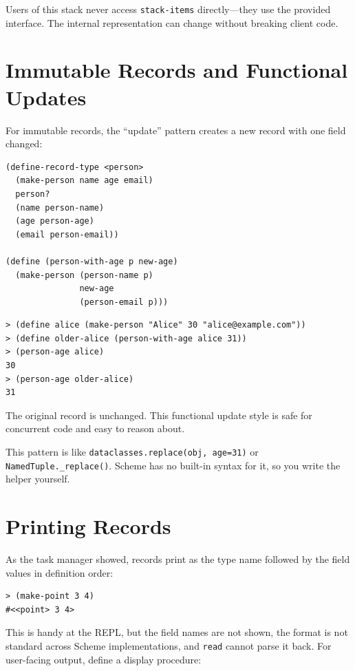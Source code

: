 Users of this stack never access \texttt{stack-items} directly---they use the provided interface. The internal representation can change without breaking client code.

\section{Immutable Records and Functional Updates}

For immutable records, the ``update'' pattern creates a new record with one field changed:

\begin{lstlisting}
(define-record-type <person>
  (make-person name age email)
  person?
  (name person-name)
  (age person-age)
  (email person-email))

(define (person-with-age p new-age)
  (make-person (person-name p)
               new-age
               (person-email p)))
\end{lstlisting}

\begin{lstlisting}[style=repl]
> (define alice (make-person "Alice" 30 "alice@example.com"))
> (define older-alice (person-with-age alice 31))
> (person-age alice)
30
> (person-age older-alice)
31
\end{lstlisting}

The original record is unchanged. This functional update style is safe for concurrent code and easy to reason about.

\begin{note}
This pattern is like \texttt{dataclasses.\allowbreak replace(obj, age=31)} or
\texttt{NamedTuple.\_replace()}.
Scheme has no built-in syntax for it, so you
write the helper yourself.
\end{note}

\section{Printing Records}

As the task manager showed, records print as the type name followed by the field values in definition order:

\begin{lstlisting}[style=repl]
> (make-point 3 4)
#<<point> 3 4>
\end{lstlisting}

This is handy at the REPL, but the field names are not shown, the format is not standard across Scheme implementations, and \texttt{read} cannot parse it back. For user-facing output, define a display procedure:

